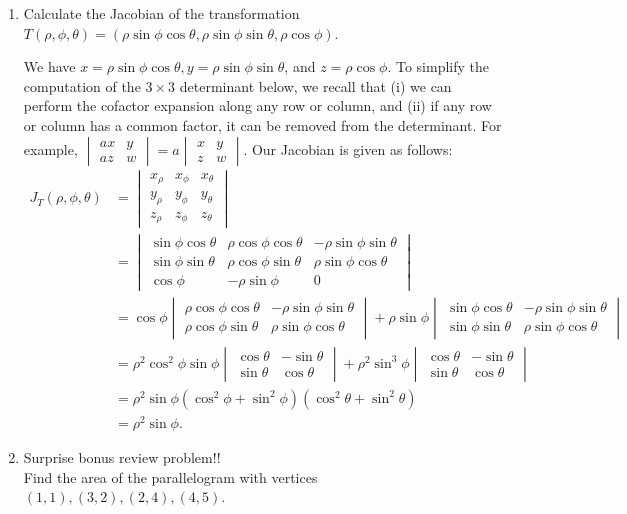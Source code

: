 \documentclass[12pt]{article}
\newcommand{\bvm}{\begin{vmatrix}}
\newcommand{\evm}{\end{vmatrix}}
\begin{document}
\thispagestyle{fancy}

 \begin{enumerate}
 \item Calculate the Jacobian of the transformation $T(\rho,\phi,\theta) = (\rho\sin\phi\cos\theta, \rho\sin\phi\sin\theta, \rho\cos\phi)$.

\bigskip

We have $x = \rho\sin\phi\cos\theta, y=\rho\sin\phi\sin\theta$, and $z=\rho\cos\phi$. To simplify the computation of the $3\times 3$ determinant below, we recall that (i) we can perform the cofactor expansion along any row or column, and (ii) if any row or column has a common factor, it can be removed from the determinant. For example, $\bvm ax & y\\az&w\evm = a\bvm x&y\\z&w\evm$. Our Jacobian is given as follows:
\begin{align*}
 J_T(\rho,\phi,\theta) & = \bvm x_\rho & x_\phi & x_\theta\\ y_\rho & y_\phi & y_\theta \\ z_\rho & z_\phi & z_\theta\evm\\
& = \bvm \sin\phi\cos\theta & \rho \cos\phi\cos\theta & -\rho\sin\phi\sin\theta\\ \sin\phi\sin\theta & \rho\cos\phi\sin\theta & \rho\sin\phi\cos\theta\\ \cos\phi & -\rho\sin\phi & 0\evm\\
& = \cos\phi\bvm \rho\cos\phi\cos\theta & -\rho\sin\phi\sin\theta\\ \rho\cos\phi\sin\theta & \rho\sin\phi\cos\theta\evm 
+ \rho\sin\phi\bvm \sin\phi\cos\theta  & -\rho\sin\phi\sin\theta\\ \sin\phi\sin\theta & \rho\sin\phi\cos\theta\evm\\
& = \rho^2\cos^2\phi\sin\phi\bvm \cos\theta & -\sin\theta\\ \sin\theta & \cos\theta\evm + \rho^2\sin^3\phi\bvm \cos\theta & -\sin\theta\\ \sin\theta & \cos\theta\evm\\
& = \rho^2\sin\phi(\cos^2\phi+\sin^2\phi)(\cos^2\theta+\sin^2\theta)\\
& = \rho^2\sin\phi.
\end{align*}


 \item Surprise bonus review problem!! \\ Find the area of the parallelogram with vertices $(1,1), (3,2), (2,4), (4,5)$.


\end{enumerate}
\end{document}
